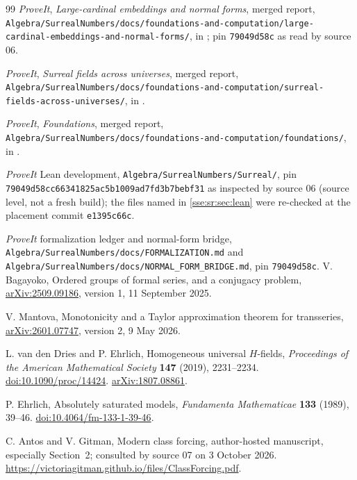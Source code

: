 \documentclass[11pt,a4paper]{article}
\numberwithin{equation}{section}
\theoremstyle{plain}
\theoremstyle{definition}
\theoremstyle{remark}
\newcommand{\code}[1]{\texttt{\small #1}}
\newcommand{\fn}[1]{\nolinkurl{#1}}%
\begin{document}
\begin{thebibliography}{99}
\emph{ProveIt}, \emph{Large-cardinal embeddings and normal forms}, merged
report,
\fn{Algebra/SurrealNumbers/docs/foundations-and-computation/large-cardinal-embeddings-and-normal-forms/},
in \cite{RepoMain}; pin \code{79049d58c} as read by source 06.

\emph{ProveIt}, \emph{Surreal fields across universes}, merged report,
\fn{Algebra/SurrealNumbers/docs/foundations-and-computation/surreal-fields-across-universes/},
in \cite{RepoMain}.

\emph{ProveIt}, \emph{Foundations}, merged report,
\fn{Algebra/SurrealNumbers/docs/foundations-and-computation/foundations/},
in \cite{RepoMain}.

\emph{ProveIt} Lean development, \fn{Algebra/SurrealNumbers/Surreal/}, pin
\code{79049d58cc66341825ac5b1009ad7fd3b7bebf31} as inspected by source 06
(source level, not a fresh build); the files named in
\cref{sse:sr:sec:lean} were re-checked at the placement commit
\code{e1395c66c}.

\emph{ProveIt} formalization ledger and normal-form bridge,
\fn{Algebra/SurrealNumbers/docs/FORMALIZATION.md} and
\fn{Algebra/SurrealNumbers/docs/NORMAL_FORM_BRIDGE.md}, pin \code{79049d58c}.
V. Bagayoko, Ordered groups of formal series, and a conjugacy problem,
\href{https://arxiv.org/abs/2509.09186}{arXiv:2509.09186}, version 1,
11 September 2025.

V. Mantova, Monotonicity and a Taylor approximation theorem for
transseries, \href{https://arxiv.org/abs/2601.07747}{arXiv:2601.07747},
version 2, 9 May 2026.

L. van den Dries and P. Ehrlich, Homogeneous universal $H$-fields,
\emph{Proceedings of the American Mathematical Society} \textbf{147}
(2019), 2231--2234.
\href{https://doi.org/10.1090/proc/14424}{doi:10.1090/proc/14424}.
\href{https://arxiv.org/abs/1807.08861}{arXiv:1807.08861}.

P. Ehrlich, Absolutely saturated models, \emph{Fundamenta Mathematicae}
\textbf{133} (1989), 39--46.
\href{https://doi.org/10.4064/fm-133-1-39-46}{doi:10.4064/fm-133-1-39-46}.

C. Antos and V. Gitman, Modern class forcing, author-hosted manuscript,
especially Section~2; consulted by source 07 on 3 October 2026.
\url{https://victoriagitman.github.io/files/ClassForcing.pdf}.

\end{thebibliography}
\endgroup
\end{document}

